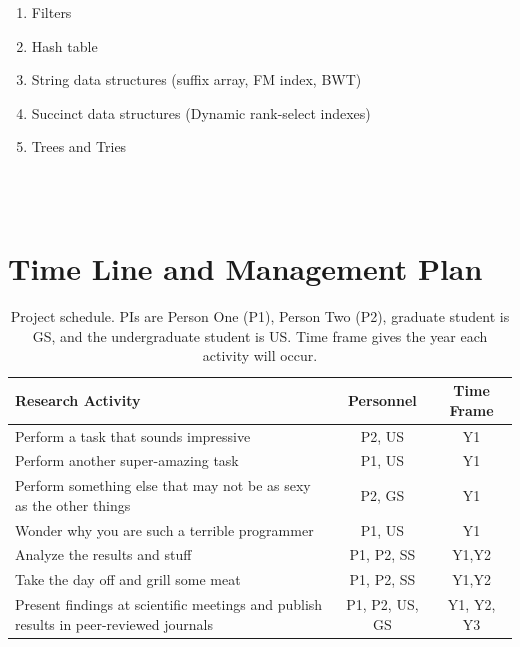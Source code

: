 \begin{enumerate}[noitemsep, leftmargin=*]
  \item Filters
  \item Hash table
  \item String data structures (suffix array, FM index, BWT)
  \item Succinct data structures (Dynamic rank-select indexes)
  \item Trees and Tries
\end{enumerate}



\\
\\


\section{Time Line and Management Plan}

\begin{table}[H]
\label{table1}
\renewcommand{\arraystretch}{0}
\caption{Project schedule.  PIs are Person One (P1), Person Two (P2), graduate student is GS, and the undergraduate student is US\@. Time frame gives the year each activity will occur.}
\scriptsize
\begin{tabularx}{\textwidth}{Y c c }
\hline
\hline
\textbf{Research Activity} & \textbf{Personnel} & \textbf{Time Frame}\\
\hline
Perform a task that sounds impressive & P2, US & Y1 \T\\
Perform another super-amazing task & P1, US & Y1 \T\\
Perform something else that may not be as sexy as the other things & P2, GS & Y1 \T\\
Wonder why you are such a terrible programmer & P1, US & Y1 \T\\
Analyze the results and stuff & P1, P2, SS & Y1,Y2 \T\\
Take the day off and grill some meat & P1, P2, SS & Y1,Y2 \T\\
Present findings at scientific meetings and publish results in peer-reviewed journals & P1, P2, US, GS & Y1, Y2, Y3\T\B\\
\hline
\hline
\end{tabularx}
\end{table}

\fi
